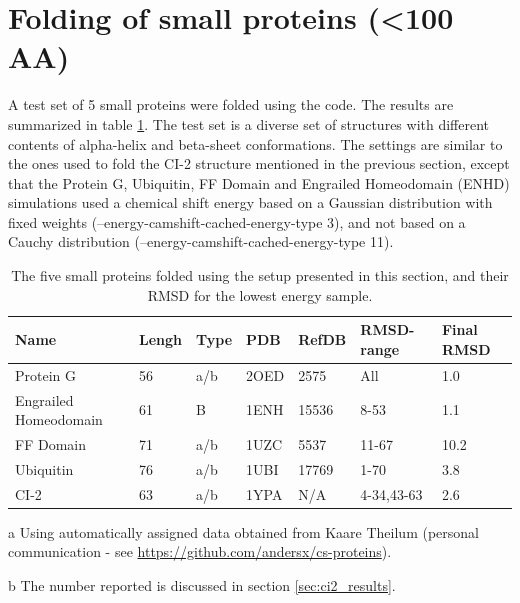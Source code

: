 \section{Folding of small proteins (\textless 100 AA)}

A test set of 5 small proteins were folded using the code. The results are summarized in table \ref{tab:folding_small}. The test set is a diverse set of structures with different contents of alpha-helix and beta-sheet conformations. 
The settings are similar to the ones used to fold the CI-2 structure mentioned in the previous section, except that the Protein G, Ubiquitin, FF Domain and Engrailed Homeodomain (ENHD) simulations used a chemical shift energy based on a Gaussian distribution with fixed weights (--energy-camshift-cached-energy-type 3), and not based on a Cauchy distribution (--energy-camshift-cached-energy-type 11).
\begin{table}
    \caption{The five small proteins folded using the setup presented in this section, and their RMSD for the lowest energy sample.}
    \begin{center}
    \begin{threeparttable}
    \begin{tabular}{l l l l l  l l}
Name                & Lengh    & Type & PDB     & RefDB     & RMSD-range    & Final RMSD   \\\hline
Protein G           & 56       & a/b & 2OED    & 2575      & All           & 1.0           \\
Engrailed Homeodomain & 61     & B   & 1ENH    & 15536     & 8-53          & 1.1           \\
FF Domain           & 71       & a/b & 1UZC    & 5537      & 11-67         & 10.2         \\
Ubiquitin           & 76       & a/b & 1UBI    & 17769     & 1-70          & 3.8           \\
CI-2                & 63       & a/b & 1YPA    & N/A\tnote{a}& 4-34,43-63  & 2.6\tnote{b}
    \end{tabular}
    \begin{tablenotes}
    \item[a] Using automatically assigned data obtained from Kaare Theilum (personal communication - see \url{https://github.com/andersx/cs-proteins}).
    \item[b] The number reported is discussed in section \ref{sec:ci2_results}.
    \end{tablenotes}
    \end{threeparttable}
    \end{center}
    \label{tab:folding_small}
\end{table}
